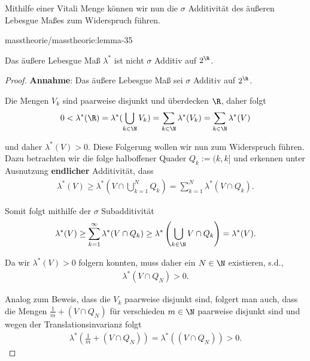\documentclass[letterpaper,10pt,german]{jupyterBook}
\begin{document}
\par
Mithilfe einer Vitali Menge können wir nun die \(\sigma\) Additivität des äußeren Lebesgue Maßes zum Widerspruch führen.
\begin{lemma}{}{masstheorie/masstheorie:lemma-35}



\par
Das äußere Lebesgue Maß \(\lambda^\ast\) ist nicht \(\sigma\) Additiv auf \(2^{\R}\).
\end{lemma}

\begin{proof}
 \textbf{Annahme}: Das äußere Lebesgue Maß sei \(\sigma\) Additiv auf \(2^{\R}\).

\par
Die Mengen \(V_k\) sind paarweise disjunkt und überdecken \(\R\), daher folgt
\begin{align*}
0<\lambda^\ast(\R) = \lambda^\ast(\bigcup_{k\in\N} V_k) = \sum_{k\in\N} \lambda^\ast(V_k) = \sum_{k\in\N} \lambda^\ast(V)
\end{align*}
\par
und daher \(\lambda^\ast(V)>0\). Diese Folgerung wollen wir nun zum Widerspruch führen. Dazu betrachten wir die folge halboffener Quader \(Q_k:=(k,k]\) und erkennen unter Ausnutzung \textbf{endlicher} Additivität, dass
\begin{align*}
\lambda^\ast(V) \geq \lambda^\ast\left(V \cap \bigcup_{k=1}^N Q_k\right) = 
\sum_{k=1}^N \lambda^\ast(V\cap Q_k).
\end{align*}
\par
Somit folgt mithilfe der \(\sigma\) Subadditivität
\begin{align*}
\lambda^\ast(V) \geq \sum_{k=1}^\infty \lambda^\ast(V\cap Q_k) \geq
\lambda^\ast\left(\bigcup_{k\in\N} V\cap Q_k\right) = \lambda^\ast(V).
\end{align*}
\par
Da wir \(\lambda^\ast(V)>0\) folgern konnten, muss daher ein \(N\in\N\) existieren, s.d.,
\begin{align*}
\lambda^\ast(V\cap Q_N) >0.
\end{align*}
\par
Analog zum Beweis, dass die \(V_k\) paarweise disjunkt sind, folgert man auch, dass die Mengen \(\frac{1}{m}+(V\cap Q_N)\) für verschieden \(m\in\N\) paarweise disjunkt sind und wegen der Translationsinvarianz folgt
\begin{align*}
\lambda^\ast(\frac{1}{m}+(V\cap Q_N)) = \lambda^\ast((V\cap Q_N)) >0.
\end{align*}

\end{proof}
\end{document}
